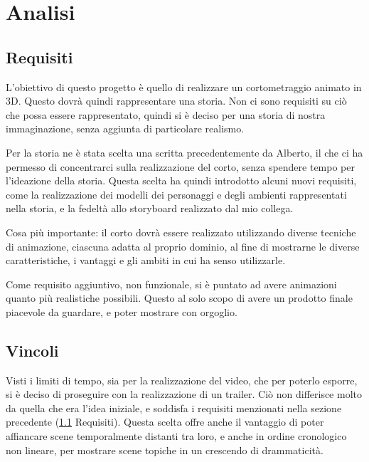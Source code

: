 
\chapter{Analisi} %

\label{Chapter2} %

\section{Requisiti} \label{req}
L'obiettivo di questo progetto è quello di realizzare un cortometraggio animato in 3D.
Questo dovrà quindi rappresentare una storia.
Non ci sono requisiti su ciò che possa essere rappresentato, quindi si è deciso per una storia di nostra immaginazione, senza aggiunta di particolare realismo.

Per la storia ne è stata scelta una scritta precedentemente da Alberto, il che ci ha permesso di concentrarci sulla realizzazione del corto, senza spendere tempo per l'ideazione della storia.
Questa scelta ha quindi introdotto alcuni nuovi requisiti, come la realizzazione dei modelli dei personaggi e degli ambienti rappresentati nella storia, e la fedeltà allo storyboard realizzato dal mio collega.

Cosa più importante: il corto dovrà essere realizzato utilizzando diverse tecniche di animazione, ciascuna adatta al proprio dominio, al fine di mostrarne le diverse caratteristiche, i vantaggi e gli ambiti in cui ha senso utilizzarle.

Come requisito aggiuntivo, non funzionale, si è puntato ad avere animazioni quanto più realistiche possibili. Questo al solo scopo di avere un prodotto finale piacevole da guardare, e poter mostrare con orgoglio.

\section{Vincoli} 
Visti i limiti di tempo, sia per la realizzazione del video, che per poterlo esporre, si è deciso di proseguire con la realizzazione di un trailer. Ciò non differisce molto da quella che era l'idea iniziale, e soddisfa i requisiti menzionati nella sezione precedente (\ref{req} Requisiti). Questa scelta offre anche il vantaggio di poter affiancare scene temporalmente distanti tra loro, e anche in ordine cronologico non lineare, per mostrare scene topiche in un crescendo di drammaticità.

